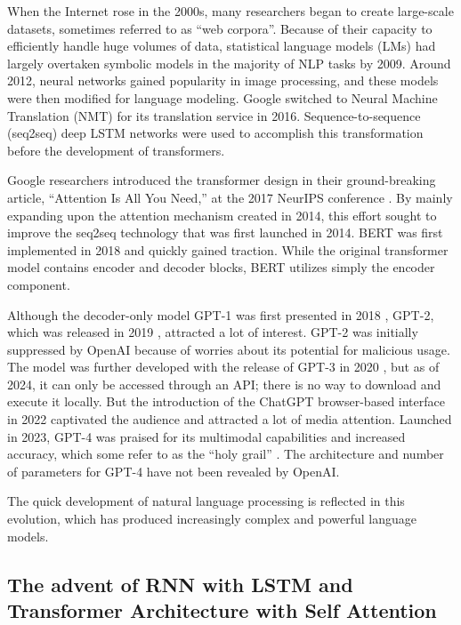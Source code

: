 When the Internet rose in the 2000s, many researchers began to create large-scale datasets, sometimes referred to as ``web corpora''. Because of their capacity to efficiently handle huge volumes of data, statistical language models (LMs) had largely overtaken symbolic models in the majority of NLP tasks by 2009. Around 2012, neural networks gained popularity in image processing, and these models were then modified for language modeling. Google switched to Neural Machine Translation (NMT) for its translation service in 2016. Sequence-to-sequence (seq2seq) deep LSTM networks were used to accomplish this transformation before the development of transformers.

Google researchers introduced the transformer design in their ground-breaking article, ``Attention Is All You Need,'' at the 2017 NeurIPS conference \cite{Vaswani2017}. By mainly expanding upon the attention mechanism created in 2014, this effort sought to improve the seq2seq technology that was first launched in 2014. BERT was first implemented in 2018 \cite{devlin2019bert} and quickly gained traction. While the original transformer model contains encoder and decoder blocks, BERT utilizes simply the encoder component.

Although the decoder-only model GPT-1 was first presented in 2018 \cite{radford2019}, GPT-2, which was released in 2019 \cite{radford2019}, attracted a lot of interest. GPT-2 was initially suppressed by OpenAI because of worries about its potential for malicious usage. The model was further developed with the release of GPT-3 in 2020 \cite{brown2020language}, but as of 2024, it can only be accessed through an API; there is no way to download and execute it locally. But the introduction of the ChatGPT browser-based interface in 2022 captivated the audience and attracted a lot of media attention. Launched in 2023, GPT-4 was praised for its multimodal capabilities and increased accuracy, which some refer to as the ``holy grail'' \cite{openai2023}. The architecture and number of parameters for GPT-4 have not been revealed by OpenAI.

The quick development of natural language processing is reflected in this evolution, which has produced increasingly complex and powerful language models.

\subsection{The advent of RNN with LSTM and Transformer Architecture with Self Attention} 

